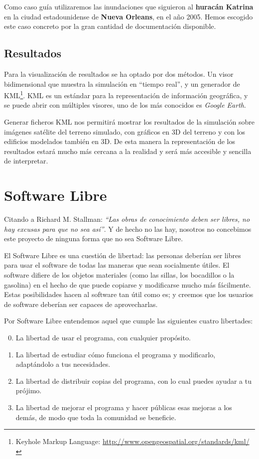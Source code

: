 Como caso guía utilizaremos las inundaciones que siguieron al {\bf huracán
Katrina} en la ciudad estadounidense de {\bf Nueva Orleans}, en el año 2005.
Hemos escogido este caso concreto por la gran cantidad de documentación
disponible.

\subsection{Resultados}

Para la visualización de resultados se ha optado por dos métodos. Un visor
bidimensional que muestra la simulación en ``tiempo real'', y un generador de
KML\footnote{Keyhole Markup Language:
\url{http://www.opengeospatial.org/standards/kml/}}. KML es un estándar para la
representación de información geográfica, y se puede abrir con múltiples
visores, uno de los más conocidos es {\em Google Earth}.

Generar ficheros KML nos permitirá mostrar los resultados de la simulación
sobre imágenes satélite del terreno simulado, con gráficos en 3D del terreno y
con los edificios modelados también en 3D. De esta manera la representación de
los resultados estará mucho más cercana a la realidad y será más accesible y
sencilla de interpretar.

\section{Software Libre}

Citando a Richard M. Stallman: {\em ``Las obras de conocimiento deben ser
libres, no hay excusas para que no sea así''}. Y de hecho no las hay, nosotros
no concebimos este proyecto de ninguna forma que no sea Software Libre.

El Software Libre es una cuestión de libertad: las personas deberían ser libres
para usar el software de todas las maneras que sean socialmente útiles. El
software difiere de los objetos materiales (como las sillas, los bocadillos o la
gasolina) en el hecho de que puede copiarse y modificarse mucho más fácilmente.
Estas posibilidades hacen al software tan útil como es; y creemos que los
usuarios de software deberían ser capaces de aprovecharlas.

Por Software Libre entendemos aquel que cumple las siguientes cuatro libertades:

\begin{enumerate}
\setcounter{enumi}{-1}
\item La libertad de usar el programa, con cualquier propósito.
\item La libertad de estudiar cómo funciona el programa y modificarlo,
adaptándolo a tus necesidades.
\item La libertad de distribuir copias del programa, con lo cual puedes ayudar a
tu prójimo.
\item La libertad de mejorar el programa y hacer públicas esas mejoras a los
demás, de modo que toda la comunidad se beneficie.
\end{enumerate}

